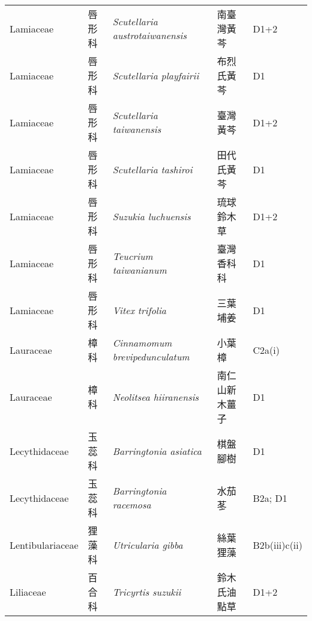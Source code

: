 {\begin{longtable}{p{2.5cm}p{2.5cm}p{4.5cm}p{2.5cm}p{3cm}}
    Lamiaceae & 唇形科 & \textit{Scutellaria austrotaiwanensis}  & 南臺灣黃芩 & D1+2 \index{Scutellaria@\textit{Scutellaria}!austrotaiwanensis@\textit{austrotaiwanensis}}  \index{南臺灣黃芩} \\
    Lamiaceae & 唇形科 & \textit{Scutellaria playfairii}  & 布烈氏黃芩 & D1 \index{Scutellaria@\textit{Scutellaria}!playfairii@\textit{playfairii}}  \index{布烈氏黃芩} \\
    Lamiaceae & 唇形科 & \textit{Scutellaria taiwanensis}  & 臺灣黃芩 & D1+2 \index{Scutellaria@\textit{Scutellaria}!taiwanensis@\textit{taiwanensis}}  \index{臺灣黃芩} \\
    Lamiaceae & 唇形科 & \textit{Scutellaria tashiroi}  & 田代氏黃芩 & D1 \index{Scutellaria@\textit{Scutellaria}!tashiroi@\textit{tashiroi}}  \index{田代氏黃芩} \\
    Lamiaceae & 唇形科 & \textit{Suzukia luchuensis}  & 琉球鈴木草 & D1+2 \index{Suzukia@\textit{Suzukia}!luchuensis@\textit{luchuensis}}  \index{琉球鈴木草} \\
    Lamiaceae & 唇形科 & \textit{Teucrium taiwanianum}  & 臺灣香科科 & D1 \index{Teucrium@\textit{Teucrium}!taiwanianum@\textit{taiwanianum}}  \index{臺灣香科科} \\
    Lamiaceae & 唇形科 & \textit{Vitex trifolia}  & 三葉埔姜 & D1 \index{Vitex@\textit{Vitex}!trifolia@\textit{trifolia}}  \index{三葉埔姜} \\
    Lauraceae & 樟科 & \textit{Cinnamomum brevipedunculatum}  & 小葉樟 & C2a(i) \index{Cinnamomum@\textit{Cinnamomum}!brevipedunculatum@\textit{brevipedunculatum}}  \index{小葉樟} \\
    Lauraceae & 樟科 & \textit{Neolitsea hiiranensis}  & 南仁山新木薑子 & D1 \index{Neolitsea@\textit{Neolitsea}!hiiranensis@\textit{hiiranensis}}  \index{南仁山新木薑子} \\
    Lecythidaceae & 玉蕊科 & \textit{Barringtonia asiatica}  & 棋盤腳樹 & D1 \index{Barringtonia@\textit{Barringtonia}!asiatica@\textit{asiatica}}  \index{棋盤腳樹} \\
    Lecythidaceae & 玉蕊科 & \textit{Barringtonia racemosa}  & 水茄苳 & B2a; D1 \index{Barringtonia@\textit{Barringtonia}!racemosa@\textit{racemosa}}  \index{水茄苳} \\
    Lentibulariaceae & 狸藻科 & \textit{Utricularia gibba}  & 絲葉狸藻 & B2b(iii)c(ii) \index{Utricularia@\textit{Utricularia}!gibba@\textit{gibba}}  \index{絲葉狸藻} \\
    Liliaceae & 百合科 & \textit{Tricyrtis suzukii}  & 鈴木氏油點草 & D1+2 \index{Tricyrtis@\textit{Tricyrtis}!suzukii@\textit{suzukii}}  \index{鈴木氏油點草} \\

\end{longtable}}
